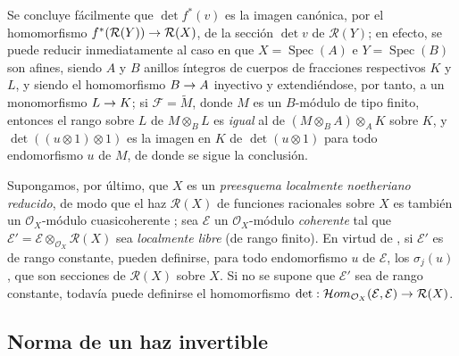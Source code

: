 \documentclass[oneside,10pt]{amsart}
\makeatletter
\newcommand{\ega@arrow}[2]{\mathchoice{#1}{#2}{#2}{#2}}
\renewcommand{\to}{\ega@arrow{\longrightarrow}{\rightarrow}}
\let\EGAOriginalLabel\label
\renewcommand{\label}[1]{\phantomsection\EGAOriginalLabel{#1}}
\makeatother
\begin{document}
\begin{env}[6.4.9]
Se concluye fácilmente que $\det f^*(v)$ es la imagen canónica, por el homomorfismo $f^*(\mathcal{R}(Y))\to\mathcal{R}(X)$, de la sección $\det v$ de $\mathcal{R}(Y)$;
en efecto, se puede reducir inmediatamente al caso en que $X=\operatorname{Spec}(A)$ e $Y=\operatorname{Spec}(B)$ son afines, siendo $A$ y $B$ anillos íntegros de cuerpos de fracciones respectivos $K$ y $L$, y siendo el homomorfismo $B\to A$ inyectivo y extendiéndose, por tanto, a un monomorfismo $L\to K$;
si $\mathcal{F}=\widetilde{M}$, donde $M$ es un $B$-módulo de tipo finito, entonces el rango sobre $L$ de $M\otimes_B L$ es \emph{igual} al de $(M\otimes_B A)\otimes_A K$ sobre $K$, y $\det((u\otimes1)\otimes1)$ es la imagen en $K$ de $\det(u\otimes1)$ para todo endomorfismo $u$ de $M$, de donde se sigue la conclusión.
\end{env}

\begin{env}[6.4.10]
\label{II.6.4.10-fr}
Supongamos, por último, que $X$ es un \emph{preesquema localmente noetheriano reducido}, de modo que el haz $\mathcal{R}(X)$ de funciones racionales sobre $X$ es también un $\mathcal{O}_X$-módulo cuasicoherente ;
sea $\mathcal{E}$ un $\mathcal{O}_X$-módulo \emph{coherente} tal que $\mathcal{E}'=\mathcal{E}\otimes_{\mathcal{O}_X}\mathcal{R}(X)$ sea \emph{localmente libre} (de rango finito).
En virtud de , si $\mathcal{E}'$ es de rango constante, pueden definirse, para todo endomorfismo $u$ de $\mathcal{E}$, los $\sigma_j(u)$, que son secciones de $\mathcal{R}(X)$ sobre $X$.
Si no se supone que $\mathcal{E}'$ sea de rango constante, todavía puede definirse el homomorfismo $\det:\mathcal{H}om_{\mathcal{O}_X}(\mathcal{E},\mathcal{E})
\to\mathcal{R}(X)$.
\end{env}

\subsection{Norma de un haz invertible}
\label{subsection:II.6.5-fr}
\end{document}
